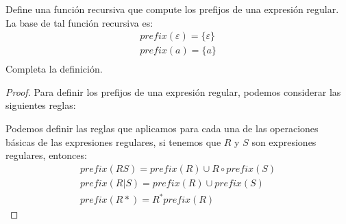 \begin{Pro}
    Define una función recursiva que compute los prefijos de una expresión regular. La
    base de tal función recursiva es: 
    \begin{align*}
        prefix(\varepsilon) = \{\varepsilon\}\\
        prefix(a) = \{a\}\\ 
    \end{align*}
    Completa la definición. 
\end{Pro}

\begin{proof}
    \hspace{5mm}
    Para definir los prefijos de una expresión regular, podemos considerar las siguientes reglas:

    Podemos definir las reglas que aplicamos para cada una de las operaciones básicas de las expresiones regulares, 
    si tenemos que $R$ y $S$ son expresiones regulares, entonces:
    \begin{align*}
        prefix(RS) = prefix(R) \cup R \circ prefix(S)\\
        prefix(R|S) = prefix(R) \cup prefix(S)\\
        prefix(R*) = R^*prefix(R)
    \end{align*}

\end{proof}